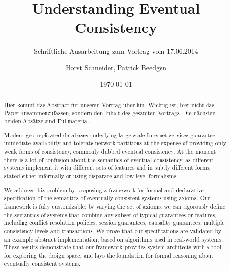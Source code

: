 \documentclass{scrartcl}
\title{Understanding Eventual Consistency}
\subtitle{Schriftliche Ausarbeitung zum Vortrag vom 17.06.2014}
\author{Horst Schneider, Patrick Beedgen}
\date{\today}
\begin{document}
 
\maketitle

\begin{abstract}
Hier kommt das Abstract für unseren Vortrag über \cite{burckhardt2013} hin. Wichtig ist, hier nicht das Paper zusammenzufassen, sondern den Inhalt des gesamten Vortrags. Die nächsten beiden Absätze sind Füllmaterial.

Modern geo-replicated databases underlying large-scale Internet services guarantee immediate availability and tolerate network partitions at the expense of providing only weak forms of consistency, commonly dubbed eventual consistency. At the moment there is a lot of confusion about the semantics of eventual consistency, as different systems implement it with different sets of features and in subtly different forms, stated either informally or using disparate and low-level formalisms.

We address this problem by proposing a framework for formal and declarative specification of the semantics of eventually consistent systems using axioms. Our framework is fully customizable: by varying the set of axioms, we can rigorously define the semantics of systems that combine any subset of typical guarantees or features, including conflict resolution policies, session guarantees, causality guarantees, multiple consistency levels and transactions. We prove that our specifications are validated by an example abstract implementation, based on algorithms used in real-world systems. These results demonstrate that our framework provides system architects with a tool for exploring the design space, and lays the foundation for formal reasoning about eventually consistent systems.
\end{abstract}

\pagebreak



\end{document}
